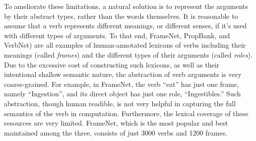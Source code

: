 To ameliorate these limitations, a natural solution is to represent the
arguments by their abstract types, rather than the words themselves.
It is reasonable to assume that a verb represents different meanings,
or different senses, if it's used with different types of arguments.
To that end, FrameNet\cite{baker1998berkeley},
PropBank\cite{kingsbury2002treebank}, and VerbNet\cite{KipperDP00})
are all examples of human-annotated lexicons of verbs including their
meanings (called {\em frames}) and the different types of their arguments
(called {\em roles}). Due to the excessive cost of constructing such
lexicons, as well as their intentional shallow semantic nature,
the abstraction of verb arguments is very coarse-grained. For example,
in FrameNet, the verb ``eat'' has just one frame, namely ``Ingestion'',
and its direct object has just one role, ``Ingestibles.''  Such abstraction,
though human readible, is not very helpful in capturing the full semantics
of the verb in computation. Furthermore, the lexical coverage of these
resources are very limited. FrameNet, which is the most popular and best
maintained among the three, consists of just 3000 verbs and 1200
frames.


